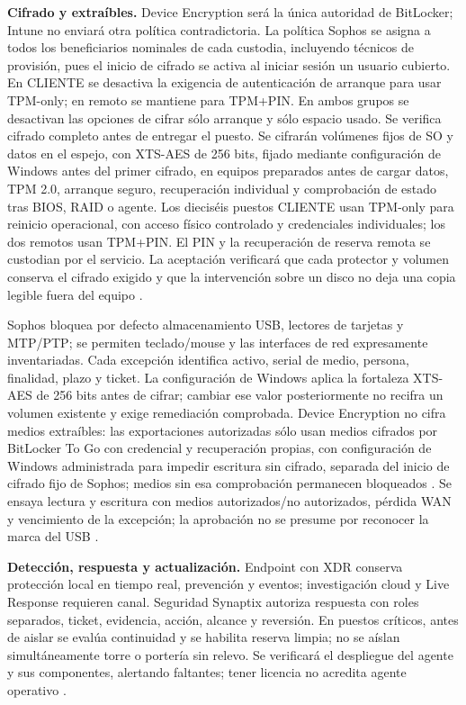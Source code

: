 \textbf{Cifrado y extraíbles.} Device Encryption será la única autoridad de BitLocker; Intune no enviará otra política contradictoria. La política Sophos se asigna a todos los beneficiarios nominales de cada custodia, incluyendo técnicos de provisión, pues el inicio de cifrado se activa al iniciar sesión un usuario cubierto. En CLIENTE se desactiva la exigencia de autenticación de arranque para usar TPM-only; en remoto se mantiene para TPM+PIN. En ambos grupos se desactivan las opciones de cifrar sólo arranque y sólo espacio usado. Se verifica cifrado completo antes de entregar el puesto. Se cifrarán volúmenes fijos de SO y datos en el espejo, con XTS-AES de 256 bits, fijado mediante configuración de Windows antes del primer cifrado, en equipos preparados antes de cargar datos, TPM 2.0, arranque seguro, recuperación individual y comprobación de estado tras BIOS, RAID o agente. Los dieciséis puestos CLIENTE usan TPM-only para reinicio operacional, con acceso físico controlado y credenciales individuales; los dos remotos usan TPM+PIN. El PIN y la recuperación de reserva remota se custodian por el servicio. La aceptación verificará que cada protector y volumen conserva el cifrado exigido y que la intervención sobre un disco no deja una copia legible fuera del equipo \parencites{p4-sophos-cifrado,p4-sophos-politica-cifrado}.

Sophos bloquea por defecto almacenamiento USB, lectores de tarjetas y MTP/PTP; se permiten teclado/mouse y las interfaces de red expresamente inventariadas. Cada excepción identifica activo, serial de medio, persona, finalidad, plazo y ticket. La configuración de Windows aplica la fortaleza XTS-AES de 256 bits antes de cifrar; cambiar ese valor posteriormente no recifra un volumen existente y exige remediación comprobada. Device Encryption no cifra medios extraíbles: las exportaciones autorizadas sólo usan medios cifrados por BitLocker To Go con credencial y recuperación propias, con configuración de Windows administrada para impedir escritura sin cifrado, separada del inicio de cifrado fijo de Sophos; medios sin esa comprobación permanecen bloqueados \parencite{p15-bitlocker-config}. Se ensaya lectura y escritura con medios autorizados/no autorizados, pérdida WAN y vencimiento de la excepción; la aprobación no se presume por reconocer la marca del USB \parencite{p4-sophos-perifericos}.

\textbf{Detección, respuesta y actualización.} Endpoint con XDR conserva protección local en tiempo real, prevención y eventos; investigación cloud y Live Response requieren canal. Seguridad Synaptix autoriza respuesta con roles separados, ticket, evidencia, acción, alcance y reversión. En puestos críticos, antes de aislar se evalúa continuidad y se habilita reserva limpia; no se aíslan simultáneamente torre o portería sin relevo. Se verificará el despliegue del agente y sus componentes, alertando faltantes; tener licencia no acredita agente operativo \parencites{p4-sophos-respuesta,p4-sophos-perifericos}.

